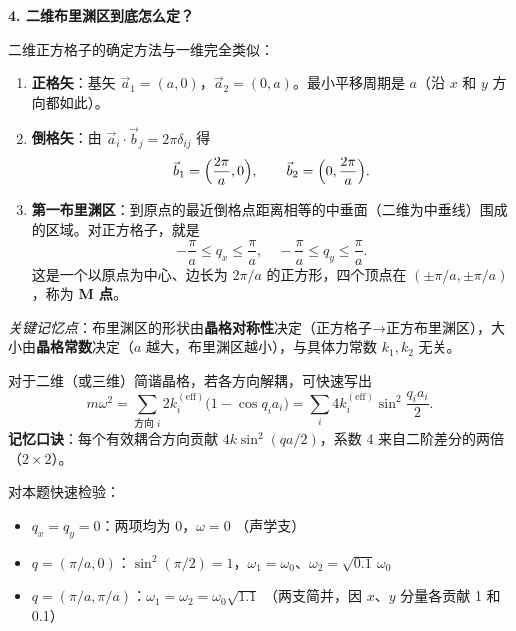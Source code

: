 \begin{insightbox}[物理图像与定性作图]
\textbf{4. 二维布里渊区到底怎么定？}

二维正方格子的确定方法与一维完全类似：
\begin{enumerate}
    \item \textbf{正格矢}：基矢 $\vec a_1=(a,0)$，$\vec a_2=(0,a)$。最小平移周期是 $a$（沿 $x$ 和 $y$ 方向都如此）。
    \item \textbf{倒格矢}：由 $\vec a_i\cdot\vec b_j = 2\pi\delta_{ij}$ 得
    \[
    \vec b_1 = \Bigl(\frac{2\pi}{a},0\Bigr), \qquad \vec b_2 = \Bigl(0,\frac{2\pi}{a}\Bigr).
    \]
    \item \textbf{第一布里渊区}：到原点的最近倒格点距离相等的中垂面（二维为中垂线）围成的区域。对正方格子，就是
    \[
    \boxed{-\frac{\pi}{a} \le q_x \le \frac{\pi}{a}, \quad -\frac{\pi}{a} \le q_y \le \frac{\pi}{a}}.
    \]
    这是一个以原点为中心、边长为 $2\pi/a$ 的正方形，四个顶点在 $(\pm\pi/a,\pm\pi/a)$，称为 \textbf{M 点}。
\end{enumerate}
\textit{关键记忆点}：布里渊区的形状由\textbf{晶格对称性}决定（正方格子→正方布里渊区），大小由\textbf{晶格常数}决定（$a$ 越大，布里渊区越小），与具体力常数 $k_1,k_2$ 无关。
\end{insightbox}

\begin{thinkbox}
对于二维（或三维）简谐晶格，若各方向解耦，可快速写出
\[
m\omega^2 = \sum_{\text{方向 }i} 2k_i^{(\text{eff})}\bigl(1-\cos q_i a_i\bigr) = \sum_i 4k_i^{(\text{eff})}\sin^2\frac{q_i a_i}{2}.
\]
\textbf{记忆口诀}：每个有效耦合方向贡献 $4k\sin^2(qa/2)$，系数 4 来自二阶差分的两倍（$2\times2$）。

对本题快速检验：
\begin{itemize}
    \item $q_x=q_y=0$：两项均为 0，$\omega=0$ \checkmark（声学支）
    \item $q=(\pi/a,0)$：$\sin^2(\pi/2)=1$，$\omega_1=\omega_0$、$\omega_2=\sqrt{0.1}\,\omega_0$ \checkmark
    \item $q=(\pi/a,\pi/a)$：$\omega_1=\omega_2=\omega_0\sqrt{1.1}$ \checkmark（两支简并，因 $x$、$y$ 分量各贡献 1 和 0.1）
\end{itemize}
\end{thinkbox}
